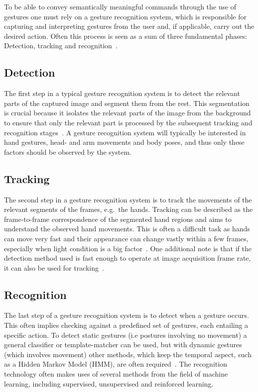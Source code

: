 To be able to convey semantically meaningful commands through the use of gestures one must rely on a gesture recognition system, 
which is responsible for capturing and interpreting gestures from the user and, if applicable, carry out the desired action. 
Often this process is seen as a sum of three fundamental phases: Detection, tracking and recognition~\citep{Rautaray2015}.

\subsection{Detection}
The first step in a typical gesture recognition system is to detect the relevant parts of the captured image and segment them from the rest. 
This segmentation is crucial because it isolates the relevant parts of the image from the background to ensure that only the relevant part is processed by the subsequent 
tracking and recognition stages~\citep{Cote2006}. 
A gesture recognition system will typically be interested in hand gestures, head- and arm movements and body poses, and thus only these factors should be observed by the system.

\subsection{Tracking}
The second step in a gesture recognition system is to track the movements of the relevant segments of the frames, e.g.~the hands. 
Tracking can be described as the frame-to-frame correspondence of the segmented hand regions and aims to understand the observed hand movements. 
This is often a difficult task as hands can move very fast and their appearance can change vastly within a few frames, 
especially when light condition is a big factor~\citep{Wang2010}. 
One additional note is that if the detection method used is fast enough to operate at image acquisition frame rate, it can also be used for tracking~\citep{Rautaray2015}.   

\subsection{Recognition}
The last step of a gesture recognition system is to detect when a gesture occurs. 
This often implies checking against a predefined set of gestures, each entailing a specific action. 
To detect static gestures (i.e postures involving no movement) a general classifier or template-matcher can be used, 
but with dynamic gestures (which involves movement) other methods, which keep the temporal aspect, such as a Hidden Markov Model (HMM), are often required~\citep{Benton1995}. 
The recognition technology often makes uses of several methods from the field of machine learning, including supervised, unsupervised and reinforced learning.

